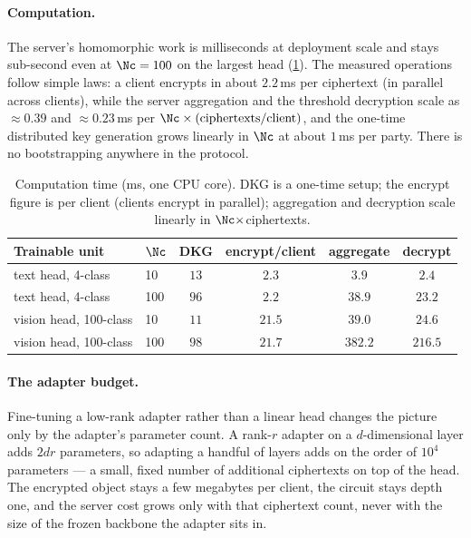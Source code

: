 \paragraph{Computation.} The server's homomorphic work is milliseconds at deployment scale and stays
sub-second even at $\Nc=100$ on the largest head (\cref{tab:cost-time}). The measured operations follow simple
laws: a client encrypts in about $2.2$\,ms per ciphertext (in parallel across clients), while the server
aggregation and the threshold decryption scale as $\approx\!0.39$ and $\approx\!0.23$\,ms per
$\Nc\times(\text{ciphertexts/client})$, and the one-time distributed key generation grows linearly in $\Nc$
at about $1$\,ms per party. There is no bootstrapping anywhere in the protocol.

\begin{table}[t]
\centering
\caption{Computation time (ms, one CPU core). DKG is a one-time setup; the encrypt figure is per client
(clients encrypt in parallel); aggregation and decryption scale linearly in $\Nc\times$ciphertexts.}
\label{tab:cost-time}
\footnotesize
\begin{tabular}{llcccc}
\toprule
Trainable unit & $\Nc$ & DKG & encrypt/client & aggregate & decrypt \\
\midrule
text head, 4-class    & 10  & $13$ & $2.3$  & $3.9$   & $2.4$ \\
text head, 4-class    & 100 & $96$ & $2.2$  & $38.9$  & $23.2$ \\
vision head, 100-class & 10  & $11$ & $21.5$ & $39.0$  & $24.6$ \\
vision head, 100-class & 100 & $98$ & $21.7$ & $382.2$ & $216.5$ \\
\bottomrule
\end{tabular}
\normalsize
\end{table}

\paragraph{The adapter budget.} Fine-tuning a low-rank adapter rather than a linear head changes the picture
only by the adapter's parameter count. A rank-$r$ adapter on a $d$-dimensional layer adds $2dr$ parameters, so
adapting a handful of layers adds on the order of $10^{4}$ parameters --- a small, fixed number of additional
ciphertexts on top of the head. The encrypted object stays a few megabytes per client, the circuit stays
depth one, and the server cost grows only with that ciphertext count, never with the size of the frozen
backbone the adapter sits in.

